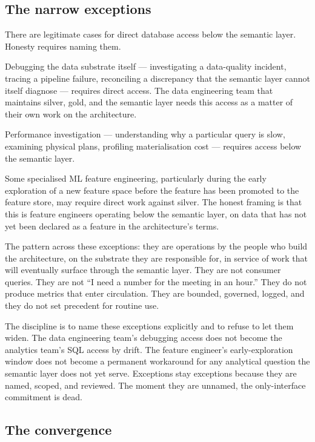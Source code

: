 \documentclass[11pt,a4paper]{article}
\begin{document}
\subsection{The narrow exceptions}

There are legitimate cases for direct database access below the semantic layer. Honesty requires naming them.

Debugging the data substrate itself --- investigating a data-quality incident, tracing a pipeline failure, reconciling a discrepancy that the semantic layer cannot itself diagnose --- requires direct access. The data engineering team that maintains silver, gold, and the semantic layer needs this access as a matter of their own work on the architecture.

Performance investigation --- understanding why a particular query is slow, examining physical plans, profiling materialisation cost --- requires access below the semantic layer.

Some specialised ML feature engineering, particularly during the early exploration of a new feature space before the feature has been promoted to the feature store, may require direct work against silver. The honest framing is that this is feature engineers operating below the semantic layer, on data that has not yet been declared as a feature in the architecture's terms.

The pattern across these exceptions: they are operations by the people who build the architecture, on the substrate they are responsible for, in service of work that will eventually surface through the semantic layer. They are not consumer queries. They are not ``I need a number for the meeting in an hour.'' They do not produce metrics that enter circulation. They are bounded, governed, logged, and they do not set precedent for routine use.

The discipline is to name these exceptions explicitly and to refuse to let them widen. The data engineering team's debugging access does not become the analytics team's SQL access by drift. The feature engineer's early-exploration window does not become a permanent workaround for any analytical question the semantic layer does not yet serve. Exceptions stay exceptions because they are named, scoped, and reviewed. The moment they are unnamed, the only-interface commitment is dead.

\subsection{The convergence}
\end{document}
